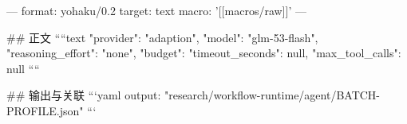 ---
format: yohaku/0.2
target: text
macro: '[[macros/raw]]'
---

## 正文
````text
{
  "provider": "adaption",
  "model": "glm-53-flash",
  "reasoning_effort": "none",
  "budget": {
    "timeout_seconds": null,
    "max_tool_calls": null
  }
}
````

## 输出与关联
```yaml
output: "research/workflow-runtime/agent/BATCH-PROFILE.json"
```
